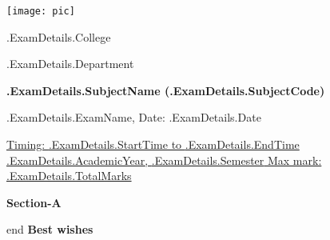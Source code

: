 \documentclass[12pt, a4paper]{exam}
\begin{document}
	\noindent
	\begin{minipage}[l]{0.1\textwidth}
		\noindent
		\texttt{[image: pic]}
	\end{minipage}
\hfill
\begin{minipage}[c]{0.8\textwidth}
	\begin{center}
		{\large	{{.ExamDetails.College}} \par
		\large	{{.ExamDetails.Department}}	\par
	\large \textbf{ {{.ExamDetails.SubjectName}} ({{.ExamDetails.SubjectCode}})}	\par
\small	{{.ExamDetails.ExamName}}, Date: {{.ExamDetails.Date}}}
	\end{center}
\end{minipage}
\par
\vspace{0.2in}
\noindent
\uline{Timing: {{.ExamDetails.StartTime}} to {{.ExamDetails.EndTime}}	\hfill {{.ExamDetails.AcademicYear}}, {{.ExamDetails.Semester}}		\hfill Max mark: {{.ExamDetails.TotalMarks}}}
\par 
\vspace{0.15in}
\noindent
\centering
\newline
{\small \bfseries {Section-A}}

{{ end }}
\vspace{0.75in}
{\large \bfseries Best wishes}
\end{document}
